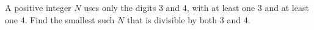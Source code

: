 A positive integer $N$ uses only the digits $3$ and $4$, with at least one $3$ and at least one $4$. Find the smallest such $N$ that is divisible by both $3$ and $4$.

